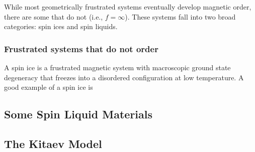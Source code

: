 While most geometrically frustrated systems eventually develop magnetic order, there are some that do not (i.e., $f = \infty$). These systems fall into two broad categories: spin ices and spin liquids.

\subsubsection{Frustrated systems that do not order}

A spin ice is a frustrated magnetic system with macroscopic ground state degeneracy that freezes into a disordered configuration at low temperature. A good example of a spin ice is 


\subsection{Some Spin Liquid Materials}

\subsection{The Kitaev Model}